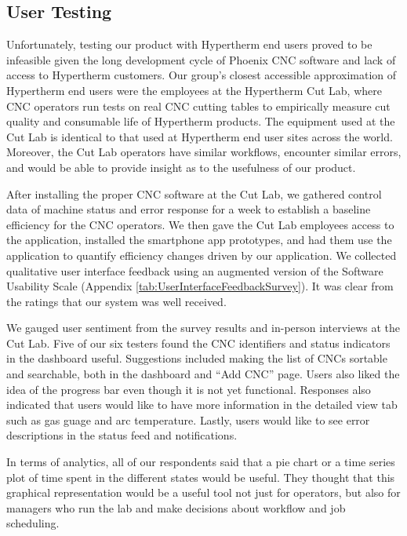 \documentclass[12pt,letterpaper,titlepage]{article}
\begin{document}
\subsection{User Testing} \label{sec:UserTesting}

Unfortunately, testing our product with Hypertherm end users proved to be infeasible given the long development cycle of Phoenix CNC software and lack of access to Hypertherm customers. Our group's closest accessible approximation of Hypertherm end users were the employees at the Hypertherm Cut Lab, where CNC operators run tests on real CNC cutting tables to empirically measure cut quality and consumable life of Hypertherm products. The equipment used at the Cut Lab is identical to that used at Hypertherm end user sites across the world. Moreover, the Cut Lab operators have similar workflows, encounter similar errors, and would be able to provide insight as to the usefulness of our product.

After installing the proper CNC software at the Cut Lab, we gathered control data of machine status and error response for a week to establish a baseline efficiency for the CNC operators. We then gave the Cut Lab employees access to the application, installed the smartphone app prototypes, and had them use the application to quantify efficiency changes driven by our application. We collected qualitative user interface feedback using an augmented version of the Software Usability Scale (Appendix \ref{tab:UserInterfaceFeedbackSurvey}). It was clear from the ratings that our system was well received.

We gauged user sentiment  from the survey results and in-person interviews at the Cut Lab. Five of our six testers found the CNC identifiers and status indicators in the dashboard useful. Suggestions included making the list of CNCs sortable and searchable, both in the dashboard and ``Add CNC'' page. Users also liked the idea of the progress bar even though it is not yet functional. Responses also indicated that users would like to have more information in the detailed view tab such as gas guage and arc temperature. Lastly, users would like to see error descriptions in the status feed and notifications.

In terms of analytics, all of our respondents said that a pie chart or a time series plot of time spent in the different states would be useful. They thought that this graphical representation would be a useful tool not just for operators, but also for managers who run the lab and make decisions about workflow and job scheduling.
\end{document}
